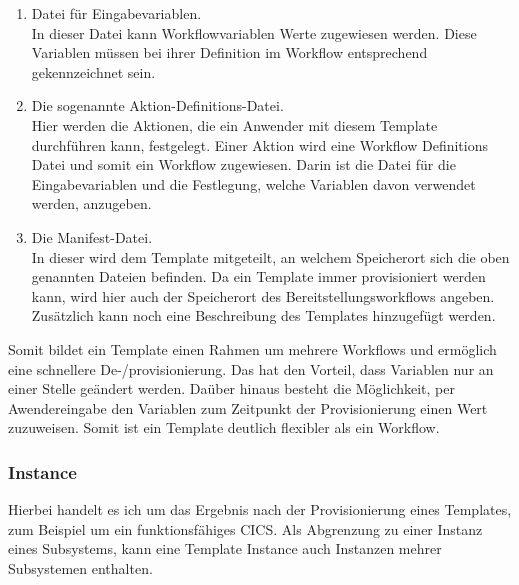 \begin{enumerate}
\item Datei für Eingabevariablen.\\
In dieser Datei kann Workflowvariablen Werte zugewiesen werden.
Diese Variablen müssen bei ihrer Definition im Workflow entsprechend gekennzeichnet sein.

\item Die sogenannte Aktion-Definitions-Datei.\\
Hier werden die Aktionen, die ein Anwender mit diesem Template durchführen kann, festgelegt.
Einer Aktion wird eine Workflow Definitions Datei und somit ein Workflow zugewiesen.
Darin ist die Datei für die Eingabevariablen und die Festlegung, welche Variablen davon verwendet werden, anzugeben.

\item Die Manifest-Datei.\\
In dieser wird dem Template mitgeteilt, an welchem Speicherort sich die oben genannten Dateien befinden.
Da ein Template immer provisioniert werden kann, wird hier auch der Speicherort des Bereitstellungsworkflows angeben.
Zusätzlich kann noch eine Beschreibung des Templates hinzugefügt werden.
\end{enumerate}

Somit bildet ein Template einen Rahmen um mehrere Workflows und ermöglich eine schnellere De-/provisionierung.
Das hat den Vorteil, dass Variablen nur an einer Stelle geändert werden.
Daüber hinaus besteht die Möglichkeit, per Awendereingabe den Variablen zum Zeitpunkt der Provisionierung einen Wert zuzuweisen.
Somit ist ein Template deutlich flexibler als ein Workflow.
\cite{IBM.2019}

\subsubsection{Instance}\label{sssec:instance}
Hierbei handelt es ich um das Ergebnis nach der Provisionierung eines Templates, zum Beispiel um ein funktionsfähiges CICS.
Als Abgrenzung zu einer Instanz eines Subsystems, kann eine Template Instance auch Instanzen mehrer Subsystemen enthalten.

